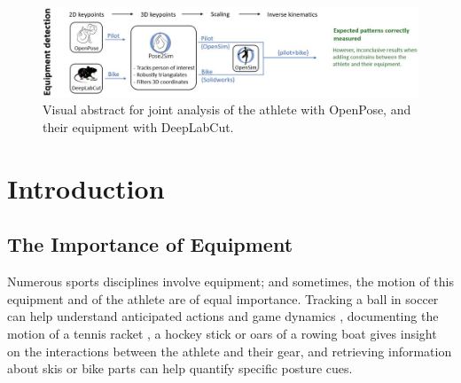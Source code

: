 \newpage

\minitoc

\vspace*{3cm}

\begin{figure}[hbtp]
	\centering
	\def\svgwidth{1\columnwidth}
	\fontsize{10pt}{10pt}\selectfont
	\includegraphics[width=\linewidth]{"../Intro/Figures/Fig_VisAbstract5.JPG"}
      \caption{Visual abstract for joint analysis of the athlete with OpenPose, and their equipment with DeepLabCut.}
	\label{fig_visabstract5}
\end{figure}

\newpage


\section{Introduction}
\subsection{The Importance of Equipment}

Numerous sports disciplines involve equipment; and sometimes, the motion of this equipment and of the athlete are of equal importance. Tracking a ball in soccer can help understand anticipated actions and game dynamics \cite{Ghasemzadeh2021}, documenting the motion of a tennis racket \cite{Martin2013}, a hockey stick \cite{Kays2017} or oars of a rowing boat \cite{Ruffaldi2015} gives insight on the interactions between the athlete and their gear, and retrieving information about skis \cite{Ludwig2020} or bike parts \cite{Rosenhahn2008} can help quantify specific posture cues.

